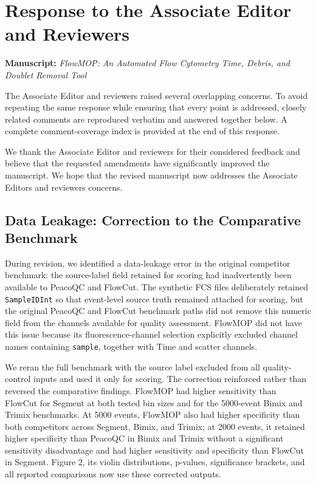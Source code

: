 \documentclass[
  11pt,
  a4paper,
]{article}
\author{}
\date{}
\begin{document}
\section{Response to the Associate Editor and
Reviewers}\label{response-to-the-associate-editor-and-reviewers}

\textbf{Manuscript:} \emph{FlowMOP: An Automated Flow Cytometry Time,
Debris, and Doublet Removal Tool}

The Associate Editor and reviewers raised several overlapping concerns.
To avoid repeating the same response while ensuring that every point is
addressed, closely related comments are reproduced verbatim and answered
together below. A complete comment-coverage index is provided at the end
of this response.

We thank the Associate Editor and reviewers for their considered
feedback and believe that the requested amendments have significantly
improved the manuscript. We hope that the revised manuscript now
addresses the Associate Editor\textquotesingle s and
reviewers\textquotesingle{} concerns.

\subsection{Data Leakage: Correction to the Comparative
Benchmark}\label{data-leakage-correction-to-the-comparative-benchmark}

During revision, we identified a data-leakage error in the original
competitor benchmark: the source-label field retained for scoring had
inadvertently been available to PeacoQC and FlowCut. The synthetic FCS
files deliberately retained \texttt{SampleIDInt} so that event-level
source truth remained attached for scoring, but the original PeacoQC and
FlowCut benchmark paths did not remove this numeric field from the
channels available for quality assessment. FlowMOP did not have this
issue because its fluorescence-channel selection explicitly excluded
channel names containing \texttt{sample}, together with Time and scatter
channels.

We reran the full benchmark with the source label excluded from all
quality-control inputs and used it only for scoring. The correction
reinforced rather than reversed the comparative findings. FlowMOP had
higher sensitivity than FlowCut for Segment at both tested bin sizes and
for the 5000-event Bimix and Trimix benchmarks. At 5000 events, FlowMOP
also had higher specificity than both competitors across Segment, Bimix,
and Trimix; at 2000 events, it retained higher specificity than PeacoQC
in Bimix and Trimix without a significant sensitivity disadvantage and
had higher sensitivity and specificity than FlowCut in Segment. Figure
2, its violin distributions, p-values, significance brackets, and all
reported comparisons now use these corrected outputs.
\end{document}
